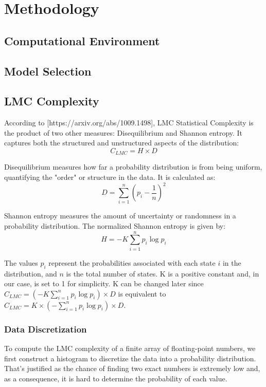 \section{Methodology}

\subsection{Computational Environment}

\subsection{Model Selection}

\subsection{LMC Complexity}

    According to [https://arxiv.org/abs/1009.1498], LMC Statistical Complexity is the product of two other measures: Disequilibrium and Shannon entropy. It captures both the structured and unstructured aspects of the distribution:
    \[ C_{LMC} = H \times D \]

    Disequilibrium measures how far a probability distribution is from being uniform, quantifying the "order" or structure in the data. It is calculated as:
    \[ D = \sum_{i=1}^{n} \left(p_i - \frac{1}{n}\right)^2 \]

    Shannon entropy measures the amount of uncertainty or randomness in a probability distribution. The normalized Shannon entropy is given by:
    \[ H = -K \sum_{i=1}^{n} p_i \log p_i \]

    The values \( p_i \) represent the probabilities associated with each state \( i \) in the distribution, and \( n \) is the total number of states. K is a positive constant and, in our case, is set to 1 for simplicity. K can be changed later since \( C_{LMC} = (-K \sum_{i=1}^{n} p_i \log p_i)  \times D \) is equivalent to \( C_{LMC} = K \times (- \sum_{i=1}^{n} p_i \log p_i)  \times D \).

    \subsubsection{Data Discretization}

        To compute the LMC complexity of a finite array of floating-point numbers, we first construct a histogram to discretize the data into a probability distribution. That's justified as the chance of finding two exact numbers is extremely low and, as a consequence, it is hard to determine the probability of each value. 
        
